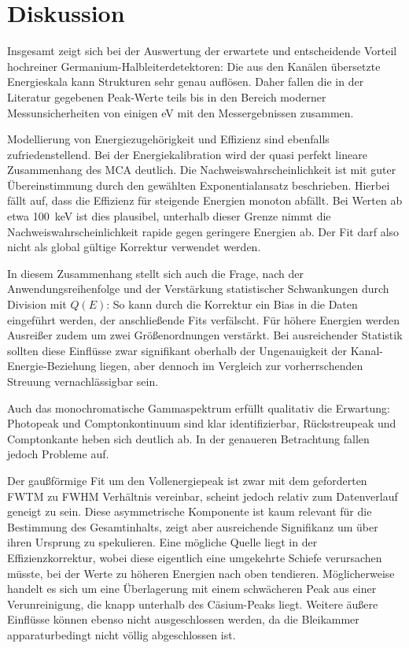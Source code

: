 \section{Diskussion}
\label{sec:diskussion}

Insgesamt zeigt sich bei der Auswertung der erwartete und entscheidende Vorteil hochreiner Germanium-Halbleiterdetektoren: Die
aus den Kanälen übersetzte Energieskala kann Strukturen sehr genau auflösen. Daher fallen die in der Literatur gegebenen Peak-Werte
teils bis in den Bereich moderner Messunsicherheiten von einigen \unit{\eV} mit den Messergebnissen zusammen.

Modellierung von Energiezugehörigkeit und Effizienz sind ebenfalls zufriedenstellend. Bei der Energiekalibration wird der
quasi perfekt lineare Zusammenhang des MCA deutlich. Die Nachweiswahrscheinlichkeit ist mit guter Übereinstimmung durch
den gewählten Exponentialansatz beschrieben. Hierbei fällt auf, dass die Effizienz für steigende Energien monoton abfällt.
Bei Werten ab etwa \qty{100}{\kilo\eV} ist dies plausibel, unterhalb dieser Grenze nimmt die Nachweiswahrscheinlichkeit
rapide gegen geringere Energien ab. Der Fit darf also nicht als global gültige Korrektur verwendet werden.

In diesem Zusammenhang stellt sich auch die Frage, nach der Anwendungsreihenfolge und der Verstärkung statistischer Schwankungen
durch Division mit $Q(E)$: So kann durch die Korrektur ein Bias in die Daten eingeführt werden, der anschließende Fits
verfälscht. Für höhere Energien werden Ausreißer zudem um zwei Größenordnungen verstärkt. Bei ausreichender Statistik
sollten diese Einflüsse zwar signifikant oberhalb der Ungenauigkeit der Kanal-Energie-Beziehung liegen, aber dennoch im Vergleich
zur vorherrschenden Streuung vernachlässigbar sein.

Auch das monochromatische Gammaspektrum erfüllt qualitativ die Erwartung: Photopeak und Comptonkontinuum sind klar identifizierbar,
Rückstreupeak und Comptonkante heben sich deutlich ab. In der genaueren Betrachtung fallen jedoch Probleme auf.

Der gaußförmige Fit um den Vollenergiepeak ist zwar mit dem geforderten FWTM zu FWHM Verhältnis vereinbar, scheint jedoch relativ
zum Datenverlauf geneigt zu sein. Diese asymmetrische Komponente ist kaum relevant für die Bestimmung des Gesamtinhalts, zeigt
aber ausreichende Signifikanz um über ihren Ursprung zu spekulieren. Eine mögliche Quelle liegt in der Effizienzkorrektur, wobei diese
eigentlich eine umgekehrte Schiefe verursachen müsste, bei der Werte zu höheren Energien nach oben tendieren. Möglicherweise handelt
es sich um eine Überlagerung mit einem schwächeren Peak aus einer Verunreinigung, die knapp unterhalb des Cäsium-Peaks liegt. Weitere
äußere Einflüsse können ebenso nicht ausgeschlossen werden, da die Bleikammer apparaturbedingt nicht völlig abgeschlossen ist.

